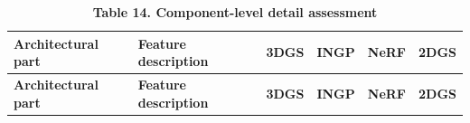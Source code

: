 \begin{longtable}[]{@{}
  >{\centering\arraybackslash}p{}
  >{\centering\arraybackslash}p{}
  >{\centering\arraybackslash}p{}
  >{\centering\arraybackslash}p{}
  >{\centering\arraybackslash}p{}
  >{\centering\arraybackslash}p{}@{}}
\caption{\textbf{Table 14. Component-level detail
assessment}}\tabularnewline
\toprule\noalign{}
\begin{minipage}[b]{\linewidth}\centering
\textbf{Architectural part}
\end{minipage} & \begin{minipage}[b]{\linewidth}\centering
\textbf{Feature description}
\end{minipage} & \begin{minipage}[b]{\linewidth}\centering
\textbf{3DGS}
\end{minipage} & \begin{minipage}[b]{\linewidth}\centering
\textbf{INGP}
\end{minipage} & \begin{minipage}[b]{\linewidth}\centering
\textbf{NeRF}
\end{minipage} & \begin{minipage}[b]{\linewidth}\centering
\textbf{2DGS}
\end{minipage} \\
\midrule\noalign{}
\endfirsthead
\toprule\noalign{}
\begin{minipage}[b]{\linewidth}\centering
\textbf{Architectural part}
\end{minipage} & \begin{minipage}[b]{\linewidth}\centering
\textbf{Feature description}
\end{minipage} & \begin{minipage}[b]{\linewidth}\centering
\textbf{3DGS}
\end{minipage} & \begin{minipage}[b]{\linewidth}\centering
\textbf{INGP}
\end{minipage} & \begin{minipage}[b]{\linewidth}\centering
\textbf{NeRF}
\end{minipage} & \begin{minipage}[b]{\linewidth}\centering
\textbf{2DGS}
\end{minipage} \\

\end{longtable}
